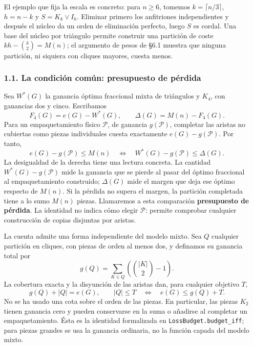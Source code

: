 \documentclass[spanish,11pt,a4paper]{article}
\begin{document}
El ejemplo que fija la escala es concreto: para \(n\ge6\), tomemos \(k=\lceil n/3\rceil\), \(h=n-k\) y \(S=K_k\vee I_h\). Eliminar primero los anfitriones independientes y después el núcleo da un orden de eliminación perfecto, luego \(S\) es cordal. Una base del núcleo por triángulo permite construir una partición de coste \(kh-\binom k2=M(n)\); el argumento de pesos de §6.1 muestra que ninguna partición, ni siquiera con cliques mayores, cuesta menos.

\subsubsection{1.1. La condición común: presupuesto de pérdida}\label{la-condiciuxf3n-comuxfan-presupuesto-de-puxe9rdida}

Sea \(W^*(G)\) la ganancia óptima fraccional mixta de triángulos y \(K_4\), con ganancias dos y cinco. Escribamos \[
F_4(G)=e(G)-W^*(G),\qquad \Delta(G)=M(n)-F_4(G).
\] Para un empaquetamiento físico \(\mathcal P\), de ganancia \(g(\mathcal P)\), completar las aristas no cubiertas como piezas individuales cuesta exactamente \(e(G)-g(\mathcal P)\). Por tanto, \[
\boxed{
e(G)-g(\mathcal P)\le M(n)
\quad\Longleftrightarrow\quad
W^*(G)-g(\mathcal P)\le\Delta(G).
}
\tag{1.3}
\] La desigualdad de la derecha tiene una lectura concreta. La cantidad \(W^*(G)-g(\mathcal P)\) mide la ganancia que se pierde al pasar del óptimo fraccional al empaquetamiento construido; \(\Delta(G)\) mide el margen que deja ese óptimo respecto de \(M(n)\). Si la pérdida no supera el margen, la partición completada tiene a lo sumo \(M(n)\) piezas. Llamaremos a esta comparación \textbf{presupuesto de pérdida}. La identidad no indica cómo elegir \(\mathcal P\): permite comprobar cualquier construcción de copias disjuntas por aristas.

La cuenta admite una forma independiente del modelo mixto. Sea \(Q\) cualquier partición en cliques, con piezas de orden al menos dos, y definamos su ganancia total por \[
g(Q)=\sum_{K\in Q}\left(\binom{|K|}{2}-1\right).
\] La cobertura exacta y la disyunción de las aristas dan, para cualquier objetivo \(T\), \[
g(Q)+|Q|=e(G),\qquad
|Q|\le T\quad\Longleftrightarrow\quad e(G)\le g(Q)+T.
\tag{1.3a}
\] No se ha usado una cota sobre el orden de las piezas. En particular, las piezas \(K_2\) tienen ganancia cero y pueden conservarse en la suma o añadirse al completar un empaquetamiento. Ésta es la identidad formalizada en \nolinkurl{LossBudget.budget_iff}; para piezas grandes se usa la ganancia ordinaria, no la función capada del modelo mixto.
\end{document}
